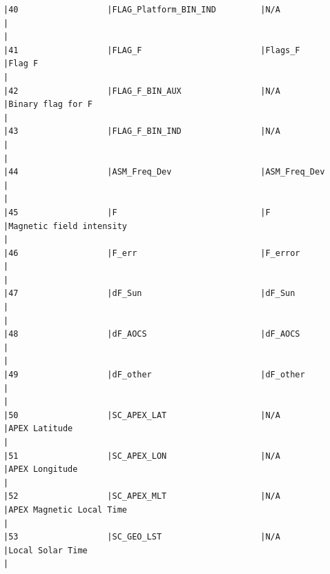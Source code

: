 \begin{verbatim}
|40                  |FLAG_Platform_BIN_IND         |N/A                           |                                                                                                    |
|41                  |FLAG_F                        |Flags_F                       |Flag F                                                                                              |
|42                  |FLAG_F_BIN_AUX                |N/A                           |Binary flag for F                                                                                   |
|43                  |FLAG_F_BIN_IND                |N/A                           |                                                                                                    |
|44                  |ASM_Freq_Dev                  |ASM_Freq_Dev                  |                                                                                                    |
|45                  |F                             |F                             |Magnetic field intensity                                                                            |
|46                  |F_err                         |F_error                       |                                                                                                    |
|47                  |dF_Sun                        |dF_Sun                        |                                                                                                    |
|48                  |dF_AOCS                       |dF_AOCS                       |                                                                                                    |
|49                  |dF_other                      |dF_other                      |                                                                                                    |
|50                  |SC_APEX_LAT                   |N/A                           |APEX Latitude                                                                                       |
|51                  |SC_APEX_LON                   |N/A                           |APEX Longitude                                                                                      |
|52                  |SC_APEX_MLT                   |N/A                           |APEX Magnetic Local Time                                                                            |
|53                  |SC_GEO_LST                    |N/A                           |Local Solar Time                                                                                    |
\end{verbatim}

